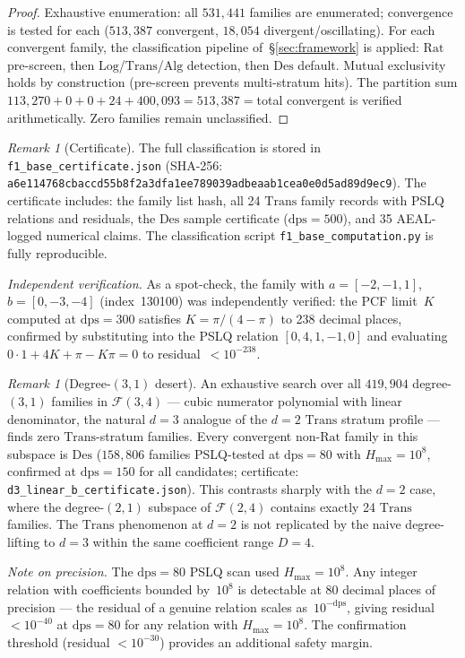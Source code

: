 \documentclass[12pt, reqno]{amsart}
\theoremstyle{definition}
\theoremstyle{remark}
\newtheorem{remark}[theorem]{Remark}
\newcommand{\Rat}{\mathrm{Rat}}
\newcommand{\Log}{\mathrm{Log}}
\newcommand{\Alg}{\mathrm{Alg}}
\newcommand{\Trans}{\mathrm{Trans}}
\newcommand{\Des}{\mathrm{Des}}
\begin{document}
\begin{proof}
Exhaustive enumeration: all $531{,}441$ families are enumerated;
convergence is tested for each ($513{,}387$ convergent, $18{,}054$ divergent/oscillating).
For each convergent family, the classification pipeline of~\S\ref{sec:framework} is applied:
$\Rat$ pre-screen, then $\Log$/$\Trans$/$\Alg$ detection, then $\Des$ default. Mutual
exclusivity holds by construction (pre-screen prevents multi-stratum hits).
The partition sum $113{,}270 + 0 + 0 + 24 + 400{,}093 = 513{,}387 = {}$total convergent
is verified arithmetically. Zero families remain unclassified.
\end{proof}

\begin{remark}[Certificate]\label{rem:cert}
The full classification is stored in
\texttt{f1\_base\_certificate.json} (SHA-256: \texttt{a6e114\allowbreak 768cba\allowbreak ccd55b\allowbreak 8f2a3d\allowbreak fa1ee7\allowbreak 89039a\allowbreak dbeaab\allowbreak 1cea0e\allowbreak 0d5ad8\allowbreak 9d9ec9}).
The certificate includes: the family list hash, all 24 $\Trans$ family records
with PSLQ relations and residuals, the $\Des$ sample certificate ($\mathrm{dps}=500$),
and 35 AEAL-logged numerical claims. The classification script
\texttt{f1\_base\_computation.py} is fully reproducible.

\emph{Independent verification.}
As a spot-check, the family
with $a = [-2, -1, 1]$, $b = [0, -3, -4]$ (index~130100)
was independently verified: the PCF limit~$K$ computed
at $\mathrm{dps}=300$ satisfies $K = \pi/(4-\pi)$ to 238 decimal places,
confirmed by substituting into the PSLQ relation
$[0, 4, 1, -1, 0]$ and evaluating $0 \cdot 1 + 4K + \pi - K\pi = 0$
to residual~$< 10^{-238}$.
\end{remark}

\begin{remark}[Degree-$(3,1)$ desert]\label{rem:d3desert}
An exhaustive search over all $419{,}904$ degree-$(3,1)$
families in $\mathcal{F}(3,4)$ --- cubic numerator polynomial with
linear denominator, the natural $d{=}3$ analogue of the
$d{=}2$ $\Trans$ stratum profile --- finds zero $\Trans$-stratum
families. Every convergent non-$\Rat$ family in this
subspace is $\Des$ ($158{,}806$ families PSLQ-tested at
$\mathrm{dps}=80$ with $H_{\max}=10^8$, confirmed at $\mathrm{dps}=150$ for all
candidates; certificate: \texttt{d3\_linear\_b\_certificate.json}).
This contrasts sharply with the $d{=}2$ case, where the
degree-$(2,1)$ subspace of $\mathcal{F}(2,4)$ contains exactly 24
$\Trans$ families. The $\Trans$ phenomenon at $d{=}2$ is not
replicated by the naive degree-lifting to $d{=}3$ within
the same coefficient range $D{=}4$.

\emph{Note on precision.}
The $\mathrm{dps}=80$ PSLQ scan used $H_{\max}=10^8$.
Any integer relation with coefficients bounded by~$10^8$
is detectable at 80 decimal places of precision --- the
residual of a genuine relation scales as~$10^{-\mathrm{dps}}$,
giving residual~$< 10^{-40}$ at $\mathrm{dps}=80$ for any relation
with $H_{\max}=10^8$. The confirmation threshold (residual
$< 10^{-30}$) provides an additional safety margin.
\end{remark}
\end{document}
